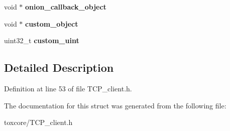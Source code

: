 \begin{DoxyCompactItemize}
\item 
\hypertarget{struct_t_c_p___client___connection_a975f7347f9eee77bcd1eb36b5e913021}{void $\ast$ {\bfseries onion\+\_\+callback\+\_\+object}}\label{struct_t_c_p___client___connection_a975f7347f9eee77bcd1eb36b5e913021}

\item 
\hypertarget{struct_t_c_p___client___connection_a5166a2d34403f1dafd1f23602df6c759}{void $\ast$ {\bfseries custom\+\_\+object}}\label{struct_t_c_p___client___connection_a5166a2d34403f1dafd1f23602df6c759}

\item 
\hypertarget{struct_t_c_p___client___connection_a1f84a5213a1e59db55448dd696113bfc}{uint32\+\_\+t {\bfseries custom\+\_\+uint}}\label{struct_t_c_p___client___connection_a1f84a5213a1e59db55448dd696113bfc}

\end{DoxyCompactItemize}


\subsection{Detailed Description}


Definition at line 53 of file T\+C\+P\+\_\+client.\+h.



The documentation for this struct was generated from the following file\+:\begin{DoxyCompactItemize}
\item 
toxcore/T\+C\+P\+\_\+client.\+h\end{DoxyCompactItemize}
